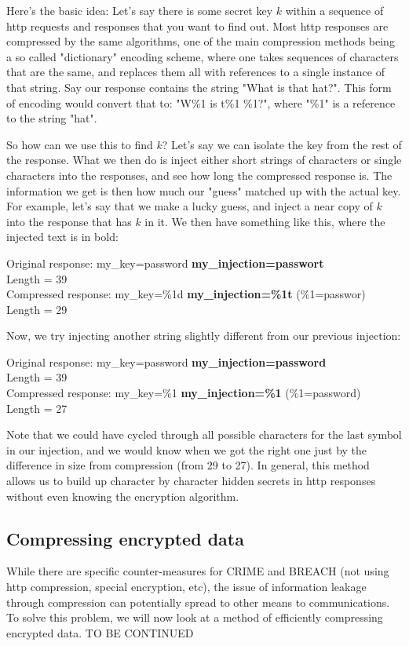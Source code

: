 \documentclass[11pt]{article}
\begin{document}
Here's the basic idea: 
Let's say there is some secret key $k$ within a sequence of http requests and responses that 
you want to find out. Most http responses are compressed by the same algorithms, one of the 
main compression methods being a so called "dictionary" encoding scheme, where one takes sequences 
of characters that are the same, and replaces them all with references to a single instance of that string. 
Say our response contains the string "What is that hat?". This form of encoding would convert that to: 
"W\%1 is t\%1 \%1?", where "\%1" is a reference to the string "hat". 

So how can we use this to find $k$? Let's say we can isolate the key from the rest of the response. 
What we then do is inject either short strings of characters or single characters into the responses, and see how long 
the compressed response is. The information we get is then how much our "guess" matched up with the actual key. 
For example, let's say that we make a lucky guess, and inject a near copy of $k$ into the response that has $k$ in it. 
We then have something like this, where the injected text is in bold:
\begin{center}
	Original response: my\_key=password \textbf{my\_injection=passwort}\\
	Length = 39\\
	Compressed response: my\_key=\%1d \textbf{my\_injection=\%1t} (\%1=passwor)\\
	Length = 29\\
\end{center}
Now, we try injecting another string slightly different from our previous injection:
\begin{center}
	Original response: my\_key=password \textbf{my\_injection=password}\\
	Length = 39\\
	Compressed response: my\_key=\%1 \textbf{my\_injection=\%1} (\%1=password)\\
	Length = 27\\
\end{center}
Note that we could have cycled through all possible characters for the last symbol in our injection, 
and we would know when we got the right one just by the difference in size from compression (from 29 to 27). 
In general, this method allows us to build up character by character hidden secrets in http responses 
without even knowing the encryption algorithm. 

\subsection{Compressing encrypted data}\label{compress-encrypt-subsect}
While there are specific counter-measures for CRIME and BREACH (not using http compression, special encryption, etc), 
the issue of information leakage through compression can potentially spread to other means to communications. 
To solve this problem, we will now look at a method of efficiently compressing encrypted data. TO BE CONTINUED






% 
% 

\end{document}
